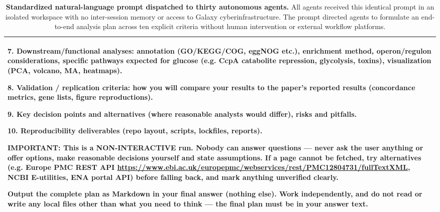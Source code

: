 \documentclass[11pt,letterpaper]{article}
\begin{document}
\begin{table}[!htbp]
\begin{tabularx}{\textwidth}{X}
7. Downstream/functional analyses: annotation (GO/KEGG/COG, eggNOG etc.), enrichment method, operon/regulon considerations, specific pathways expected for glucose (e.g. CcpA catabolite repression, glycolysis, toxins), visualization (PCA, volcano, MA, heatmaps). \par
8. Validation / replication criteria: how you will compare your results to the paper's reported results (concordance metrics, gene lists, figure reproductions). \par
9. Key decision points and alternatives (where reasonable analysts would differ), risks and pitfalls. \par
10. Reproducibility deliverables (repo layout, scripts, lockfiles, reports). \par\vspace{0.4em}
IMPORTANT: This is a NON-INTERACTIVE run. Nobody can answer questions --- never ask the user anything or offer options, make reasonable decisions yourself and state assumptions. If a page cannot be fetched, try alternatives (e.g. Europe PMC REST API \url{https://www.ebi.ac.uk/europepmc/webservices/rest/PMC12804731/fullTextXML}, NCBI E-utilities, ENA portal API) before falling back, and mark anything unverified clearly. \par\vspace{0.4em}
Output the complete plan as Markdown in your final answer (nothing else). Work independently, and do not read or write any local files other than what you need to think --- the final plan must be in your answer text. \\
\bottomrule
\end{tabularx}
\caption{\textbf{Standardized natural-language prompt dispatched to thirty autonomous agents.} All agents received this identical prompt in an isolated workspace with no inter-session memory or access to Galaxy cyberinfrastructure. The prompt directed agents to formulate an end-to-end analysis plan across ten explicit criteria without human intervention or external workflow platforms.}
\label{tab:planning_prompt}
\end{table}
\end{document}
